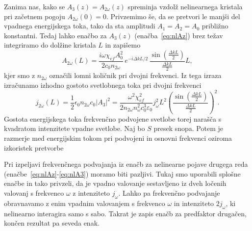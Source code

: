 Zanima nas, kako se $A_{3}(z) = A_{2\omega}(z)$ spreminja vzdolž nelinearnega kristala
pri začetnem pogoju $A_{2\omega}(0)=0$.
Privzemimo še, da se pretvori le manjši del vpadnega energijskega toka,
tako da sta amplitudi $A_{1}=A_{2}=A_0$ približno konstantni. Tedaj lahko
enačbo za $A_{3}(z)$ (enačba~\ref{eq:nlAz}) brez težav integriramo do dolžine kristala $L$ in 
zapišemo
\begin{equation}
A_{2\omega}(L)=\frac{i\omega \chi_{ef} A_0^2}{2c_0 n_{2\omega}}
\,e^{-i\Delta kL/2}\, \frac{\sin\left(\frac{\Delta k L}{2}\right)}{\frac{\Delta kL}{2}}L,
\label{8.9}
\end{equation}
kjer smo z $n_{2\omega}$ označili lomni količnik pri dvojni frekvenci.
Iz tega izraza izračunamo izhodno gostoto svetlobnega toka pri dvojni
frekvenci 
\begin{equation}
j_{2\omega}(L) =\frac{1}{2}\epsilon_{0}n_{2\omega}c_0|A_3|^2 = 
\frac{\omega^2 \chi_{ef}^2}{2 n_{2\omega} n_\omega^2c_0^3\varepsilon_0} j_\omega^2 L^2
\left(\frac{\sin\left(\frac{\Delta k L}{2}\right)}{\frac{\Delta kL}{2}}\right)^2.
\label{8.10}
\end{equation}
Gostota energijskega toka frekvenčno podvojene svetlobe torej narašča s kvadratom
intenzitete vpadne svetlobe. Naj bo $S$ presek snopa. Potem je razmerje med 
energijskim tokom pri podvojeni in osnovni frekvenci oziroma izkoristek pretvorbe

\begin{remark}
Pri izpeljavi frekvenčnega podvajanja iz enačb za nelinearne pojave drugega
reda (enačbe~\ref{eq:nlAz}-\ref{eq:nlA3}) moramo biti pazljivi. 
Tukaj smo uporabili splošne enačbe in tako privzeli, da je 
vpadno valovanje sestavljeno iz dveh ločenih valovanj s frekvenco $\omega$
z intenziteto $j_\omega$. Lahko pa frekvenčno podvajanje obravnavamo
z enim vpadnim valovanjem s frekvenco $\omega$ in intenziteto $2j_\omega$, 
ki nelinearno interagira samo s sabo. Takrat je zapis enačb za predfaktor
drugačen, končen rezultat pa seveda enak. 
\end{remark}

